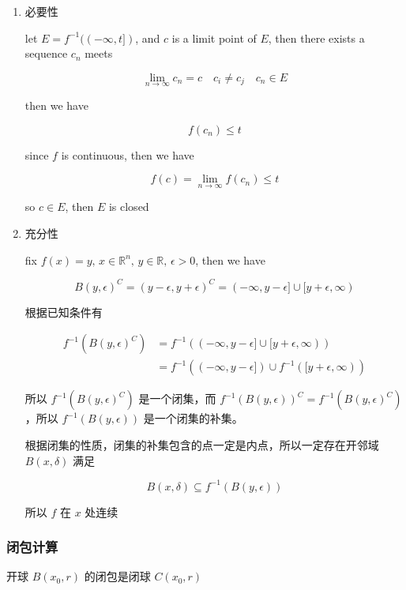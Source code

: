 \documentclass[12pt,a4paper]{ctexart}
\begin{document}
\begin{enumerate}
    \item 必要性

    let $E = f^{-1}((-\infty, t])$, and $c$ is a limit point of $E$, then there exists a sequence $c_n$ meets

    \[
        \lim_{n \to \infty} c_n = c \quad c_i \ne c_j\quad c_n \in E
    \]

    then we have

    \[
        f(c_n) \le t
    \]

    since $f$ is continuous, then we have

    \[
        f(c) = \lim_{n \to \infty}f(c_n) \le t
    \]

    so $c \in E$, then $E$ is closed

    \item 充分性

    fix $f(x) = y,\, x \in \mathbb{R}^n,\, y \in \mathbb{R},\, \epsilon > 0$, then we have

    \[
        B(y, \epsilon)^C = (y-\epsilon, y+\epsilon)^C = (-\infty, y-\epsilon] \cup [y+\epsilon, \infty)
    \]

    根据已知条件有

    \begin{align*}
        f^{-1}(B(y, \epsilon)^C) &= f^{-1}((-\infty, y-\epsilon] \cup [y+\epsilon, \infty))  \\
        &= f^{-1}((-\infty, y-\epsilon]) \cup f^{-1}([y+\epsilon, \infty))
    \end{align*}

    所以 $f^{-1}(B(y, \epsilon)^C)$ 是一个闭集，而 $f^{-1}(B(y, \epsilon))^C = f^{-1}(B(y, \epsilon)^C)$，所以 $f^{-1}(B(y, \epsilon))$ 是一个闭集的补集。

    根据闭集的性质，闭集的补集包含的点一定是内点，所以一定存在开邻域 $B(x, \delta)$ 满足

    \[
        B(x, \delta) \subseteq f^{-1}(B(y, \epsilon))
    \]

    所以 $f$ 在 $x$ 处连续
\end{enumerate}

\subsubsection{闭包计算}

开球 $B(x_0, r)$ 的闭包是闭球 $C(x_0, r)$
\end{document}
